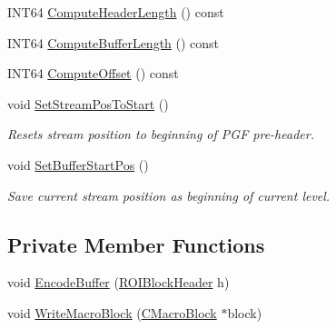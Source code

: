 \begin{DoxyCompactItemize}
\item 
I\+N\+T64 \mbox{\hyperlink{classCEncoder_a5c8dc9273c8a17ce72e86fec5f389112}{Compute\+Header\+Length}} () const
\item 
I\+N\+T64 \mbox{\hyperlink{classCEncoder_a41cb748b6797fc6de436e546f3d76ff2}{Compute\+Buffer\+Length}} () const
\item 
I\+N\+T64 \mbox{\hyperlink{classCEncoder_a8aadfcf080fad9a5cd82b532dc847d5b}{Compute\+Offset}} () const
\item 
void \mbox{\hyperlink{classCEncoder_ae0e408b0d15b7b2ad1f28236e980b00e}{Set\+Stream\+Pos\+To\+Start}} ()
\begin{DoxyCompactList}\small\item\em Resets stream position to beginning of P\+GF pre-\/header. \end{DoxyCompactList}\item 
void \mbox{\hyperlink{classCEncoder_a0b2fefcc1d7c95b14e62c71caa1e4fdb}{Set\+Buffer\+Start\+Pos}} ()
\begin{DoxyCompactList}\small\item\em Save current stream position as beginning of current level. \end{DoxyCompactList}\end{DoxyCompactItemize}
\subsection*{Private Member Functions}
\begin{DoxyCompactItemize}
\item 
void \mbox{\hyperlink{classCEncoder_a4f7ab5b52587e7bd574e4e790fb90fd1}{Encode\+Buffer}} (\mbox{\hyperlink{unionROIBlockHeader}{R\+O\+I\+Block\+Header}} h)
\item 
void \mbox{\hyperlink{classCEncoder_ab64923561baadef47bea653e9a52238e}{Write\+Macro\+Block}} (\mbox{\hyperlink{classCEncoder_1_1CMacroBlock}{C\+Macro\+Block}} $\ast$block)
\end{DoxyCompactItemize}
